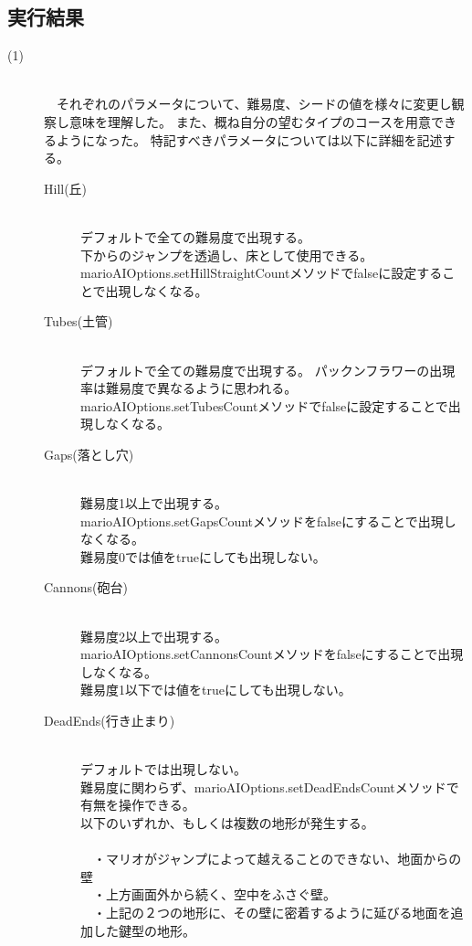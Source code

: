 \documentclass[a4j]{jarticle}
\begin{document}
\subsection{実行結果}
\begin{description}
\item[(1)]~\\
　それぞれのパラメータについて、難易度、シードの値を様々に変更し観察し意味を理解した。
また、概ね自分の望むタイプのコースを用意できるようになった。
特記すべきパラメータについては以下に詳細を記述する。
	\begin{description}
	\item[Hill(丘)] ~\\
	デフォルトで全ての難易度で出現する。\\
	下からのジャンプを透過し、床として使用できる。\\
	marioAIOptions.setHillStraightCountメソッドでfalseに設定することで出現しなくなる。
	\item[Tubes(土管)]　~\\
	デフォルトで全ての難易度で出現する。 パックンフラワーの出現率は難易度で異なるように思われる。\\
	marioAIOptions.setTubesCountメソッドでfalseに設定することで出現しなくなる。
	\item [Gaps(落とし穴)] ~\\
	難易度1以上で出現する。\\
	marioAIOptions.setGapsCountメソッドをfalseにすることで出現しなくなる。\\
	難易度0では値をtrueにしても出現しない。
	\item [Cannons(砲台)] ~\\
	難易度2以上で出現する。\\
	marioAIOptions.setCannonsCountメソッドをfalseにすることで出現しなくなる。\\
	難易度1以下では値をtrueにしても出現しない。
	\item [DeadEnds(行き止まり)] ~\\
	デフォルトでは出現しない。\\
	難易度に関わらず、marioAIOptions.setDeadEndsCountメソッドで有無を操作できる。\\
	以下のいずれか、もしくは複数の地形が発生する。\\
	\\
	　・マリオがジャンプによって越えることのできない、地面からの壁\\
	　・上方画面外から続く、空中をふさぐ壁。\\
	　・上記の２つの地形に、その壁に密着するように延びる地面を追加した鍵型の地形。\\

\end{description}
\end{description}
\end{document}
